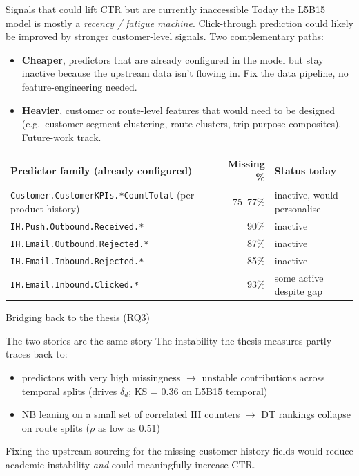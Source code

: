 \documentclass[aspectratio=169,11pt]{beamer}
\begin{document}
\begin{frame}{Signals that could lift CTR but are currently inaccessible}
  Today the L5B15 model is mostly a \emph{recency / fatigue machine}. Click-through prediction could likely be improved by stronger customer-level signals. Two complementary paths:
  \vspace{0.3em}
  \begin{itemize}
    \item \textbf{Cheaper}, predictors that are already configured in the model but stay inactive because the upstream data isn't flowing in. Fix the data pipeline, no feature-engineering needed.
    \item \textbf{Heavier}, customer or route-level features that would need to be designed (e.g.\ customer-segment clustering, route clusters, trip-purpose composites). Future-work track.
  \end{itemize}
  \vspace{0.4em}
  \footnotesize
  \begin{tabular}{@{}l r l@{}}
    \toprule
    \textbf{Predictor family (already configured)}                     & \textbf{Missing \%} & \textbf{Status today} \\
    \midrule
    \texttt{Customer.CustomerKPIs.*CountTotal} (per-product history)  & 75--77\%            & inactive, would personalise \\
    \texttt{IH.Push.Outbound.Received.*}                              & 90\%                & inactive \\
    \texttt{IH.Email.Outbound.Rejected.*}                             & 87\%                & inactive \\
    \texttt{IH.Email.Inbound.Rejected.*}                              & 85\%                & inactive \\
    \texttt{IH.Email.Inbound.Clicked.*}                               & 93\%                & some active despite gap \\
    \bottomrule
  \end{tabular}
\end{frame}

\begin{frame}{Bridging back to the thesis (RQ3)}
  \begin{block}{The two stories are the same story}
    The instability the thesis measures partly traces back to:
    \begin{itemize}
      \item predictors with very high missingness $\rightarrow$ unstable contributions across temporal splits (drives $\delta_d$; KS = 0.36 on L5B15 temporal)
      \item NB leaning on a small set of correlated IH counters $\rightarrow$ DT rankings collapse on route splits ($\rho$ as low as 0.51)
    \end{itemize}
    Fixing the upstream sourcing for the missing customer-history fields would reduce academic instability \emph{and} could meaningfully increase CTR.
  \end{block}
\end{frame}
\end{document}
